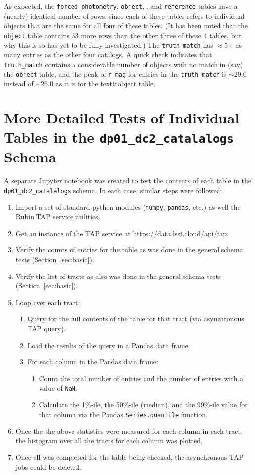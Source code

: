 \documentclass[DM,authoryear,toc]{lsstdoc}
\begin{document}
As expected, the \texttt{forced\_photometry}, \texttt{object}, \texttt{}, and \texttt{reference} tables have a (nearly) identical number of rows, since each of these tables refers to individual objects that are the same for all four of these tables.  (It has been noted that the \texttt{object} table contains 33 more rows than the other three of these 4 tables, but why this is so has yet to be fully investigated.)  The \texttt{truth\_match} has $\approx$5$\times$ as many entries as the other four catalogs.  A quick check indicates that  \texttt{truth\_match} contains a considerable number of objects with no match in (say) the \texttt{object} table, and the peak of \texttt{r\_mag} for entries in the \texttt{truth\_match} is $\sim$29.0 instead of $\sim$26.0 as it is for the texttt{object} table.

\section{More Detailed Tests of Individual Tables in the  \texttt{dp01\_dc2\_catalalogs} Schema} \label{sec:detailed}

A separate Jupyter notebook was created to test the contents of each
table in the \texttt{dp01\_dc2\_catalalogs} schema.  In each case,
similar steps were followed:
\begin{enumerate}
\item Import a set of standard python modules (\texttt{numpy},
  \texttt{pandas}, etc.) as well the Rubin TAP service utilities.
\item Get an instance of the TAP service at
  \url{https://data.lsst.cloud/api/tap}.
\item Verify the counts of entries for the table as was done in the
  general schema tests (Section~\ref{sec:basic}).
\item Verify the list of tracts as also was done in the general schema
  tests (Section~\ref{sec:basic}).
\item Loop over each tract:
  \begin{enumerate}
  \item Query for the full contents of the table for that tract (via asynchronous TAP query).
  \item Load the results of the query in a Pandas data frame.
  \item For each column in the Pandas data frame:
    \begin{enumerate}
    \item Count the total number of entries and the number of entries with a value of \texttt{NaN}.
    \item Calculate the 1\%-ile, the 50\%-ile (median), and the 99\%-ile value for that column via the Pandas \texttt{Series.quantile} function.
    \end{enumerate}
  \end{enumerate}
\item Once the the above statistics were measured for each column in each tract, the histogram over all the tracts for each column was plotted.
\item Once all was completed for the table being checked, the asynchronous TAP jobs could be deleted.
\end{enumerate}
\end{document}
